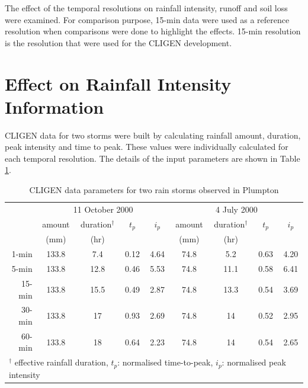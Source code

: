 The effect of the temporal resolutions on rainfall intensity, runoff and soil
loss
were examined. For comparison purpose, 15-min data were used as a reference
resolution when comparisons were done to highlight the effects. 15-min
resolution is
the resolution that were used for the CLIGEN development.


\section{Effect on Rainfall Intensity Information}
\label{sec:EffectsOnRainfallIntensityInput}

CLIGEN data for two storms were built by calculating rainfall amount, duration,
peak intensity and time to peak. These values were individually calculated for
each temporal resolution. The details of the input parameters are shown in Table
\ref{tab:CLIGENWEPPInputFileParameters}.

\begin{table}[htbp]
  \centering
  \small
  \caption{CLIGEN data parameters for two rain storms observed in
Plumpton}
  \label{tab:CLIGENWEPPInputFileParameters}
    \begin{tabular}{rcccccccc} \toprule
       & \multicolumn{4}{c}{11 October 2000} &
\multicolumn{4}{c}{4 July 2000}\\
       \cmidrule(r){2-5} \cmidrule(l){6-9}
       & amount & duration$^{\dagger}$ & $t_p$ & $i_p$ & amount &
duration$^{\dagger}$ & $t_p$ & $i_p$\\
       & \scriptsize(mm) & \scriptsize(hr) & & & \scriptsize(mm) &
\scriptsize(hr) & & \\
       \midrule
      1-min  & 133.8 & 7.4  & 0.12 & 4.64 & 74.8 & 5.2  & 0.63 & 4.20\\
      5-min  & 133.8 & 12.8 & 0.46 & 5.53 & 74.8 & 11.1 & 0.58 & 6.41\\
      15-min & 133.8 & 15.5 & 0.49 & 2.87 & 74.8 & 13.3 & 0.54 & 3.69\\
      30-min & 133.8 & 17   & 0.93 & 2.69 & 74.8 & 14   & 0.52 & 2.95\\
      60-min & 133.8 & 18   & 0.64 & 2.23 & 74.8 & 14   & 0.54 & 2.65\\
      \bottomrule
      \multicolumn{9}{l}{\footnotesize $^\dagger$ effective rainfall
duration, {\normalsize{$t_p$}}: normalised time-to-peak, {\normalsize{$i_p$}}:
normalised peak intensity}
    \end{tabular}
\end{table}

